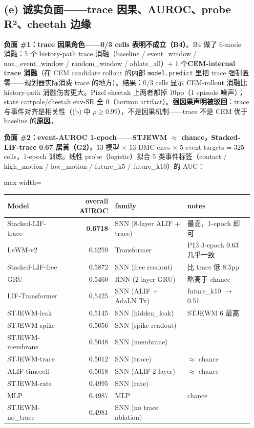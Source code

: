 \documentclass[11pt,a4paper]{article}
\begin{document}
\subsection{(e) 诚实负面——trace 因果、AUROC、probe R²、cheetah 边缘}

\textbf{负面 \#1：trace 因果角色——0/3 cells 表明不成立（B4）}。B4 做了 6-mode 消融：5 个 history-path trace 消融（baseline / event\_window / non\_event\_window / random\_window / ablate\_all）+ 1 个\textbf{CEM-internal trace 消融}（在 CEM candidate rollout 的内部 \texttt{model.predict} 里把 trace 强制置零——规划器实际消费 trace 的地方）。结果：0/3 cells 显示 CEM-rollout 消融比 history-path 消融伤害更大。Pixel cheetah 上两者都掉 10pp（1 episode 噪声）；state cartpole/cheetah env-SR 全 0（horizon artifact）。\textbf{强因果声明被驳回}：trace 与事件对齐是相关性（(b) 中 $\rho \geq 0.99$），不是因果机制——trace 不是 CEM 优于 baseline 的\textbf{原因}。

\textbf{负面 \#2：event-AUROC 1-epoch——STJEWM $\approx$ chance，Stacked-LIF-trace 0.67 居首（G2）}。13 模型 × 13 DMC envs × 5 event targets = 325 cells，1-epoch 训练。线性 probe（logistic）拟合 5 类事件标签（contact / high\_motion / low\_motion / future\_k5 / future\_k10）的 AUC：
\begin{adjustbox}{max width=\textwidth}
\scriptsize
\begin{tabular}{lrll}
\toprule
\textbf{Model} & \textbf{overall AUROC} & \textbf{family} & \textbf{notes} \\
\midrule
Stacked-LIF-trace & \textbf{0.6718} & SNN (8-layer ALIF + trace) & 最高，1-epoch 即可 \\
LeWM-v2 & 0.6259 & Transformer & P13 3-epoch 0.63 几乎一致 \\
Stacked-LIF-free & 0.5872 & SNN (free readout) & 比 trace 低 8.5pp \\
GRU & 0.5460 & RNN (2-layer GRU) & 略高于 chance \\
LIF-Transformer & 0.5425 & SNN (ALIF + AdaLN Tx) & future\_k10 $\to$ 0.51 \\
STJEWM-leak & 0.5145 & SNN (hidden\_leak) & STJEWM 6 最高 \\
STJEWM-spike & 0.5056 & SNN (spike readout) & \\
STJEWM-membrane & 0.5048 & SNN (membrane) & \\
STJEWM-trace & 0.5012 & SNN (trace) & $\approx$ chance \\
ALIF-timecell & 0.5018 & SNN (ALIF 2-layer) & $\approx$ chance \\
STJEWM-rate & 0.4995 & SNN (rate) & \\
MLP & 0.4987 & MLP & chance \\
STJEWM-no\_trace & 0.4981 & SNN (no trace ablation) & \\
\bottomrule
\end{tabular}
\end{adjustbox}
\end{document}
